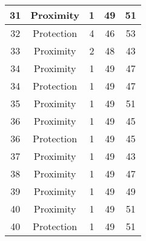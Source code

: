 \documentclass[results.tex]{subfiles}
\begin{document}
\begin{center}
\begin{tabular}{| c || c | c | c | c |}
            \hline
            31                      & Proximity                    & 1                      & 49                      & 51                   \\
            \hline
            32                      & Protection                   & 4                      & 46                      & 53                   \\
            \hline
            33                      & Proximity                    & 2                      & 48                      & 43                   \\
            \hline
            34                      & Proximity                    & 1                      & 49                      & 47                   \\
            \hline
            34                      & Protection                   & 1                      & 49                      & 47                   \\
            \hline
            35                      & Proximity                    & 1                      & 49                      & 51                   \\
            \hline
            36                      & Proximity                    & 1                      & 49                      & 45                   \\
            \hline
            36                      & Protection                   & 1                      & 49                      & 45                   \\
            \hline
            37                      & Proximity                    & 1                      & 49                      & 43                   \\
            \hline
            38                      & Proximity                    & 1                      & 49                      & 47                   \\
            \hline
            39                      & Proximity                    & 1                      & 49                      & 49                   \\
            \hline
            40                      & Proximity                    & 1                      & 49                      & 51                   \\
            \hline
            40                      & Protection                   & 1                      & 49                      & 51                   \\

\end{tabular}
\end{center}
\end{document}

